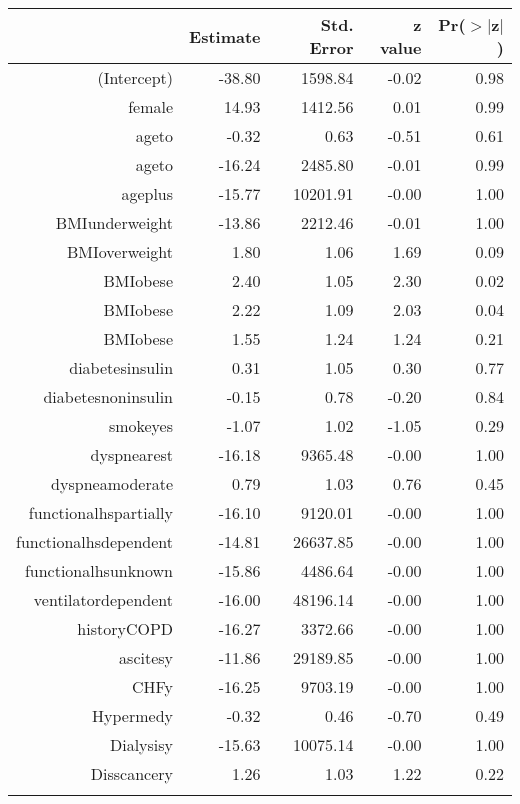 \bigskip\bigskip
\centering
\begin{tabular}{rrrrr}
  \hline
 & Estimate & Std. Error & z value & Pr($>$$|$z$|$) \\ 
  \hline
(Intercept) & -38.80 & 1598.84 & -0.02 & 0.98 \\ 
  female & 14.93 & 1412.56 & 0.01 & 0.99 \\ 
  age\-65\-to\-74 & -0.32 & 0.63 & -0.51 & 0.61 \\ 
  age\-75\-to\-84 & -16.24 & 2485.80 & -0.01 & 0.99 \\ 
  age\-85\-plus & -15.77 & 10201.91 & -0.00 & 1.00 \\ 
  BMI\-underweight & -13.86 & 2212.46 & -0.01 & 1.00 \\ 
  BMI\-overweight & 1.80 & 1.06 & 1.69 & 0.09 \\ 
  BMI\-obese\-1 & 2.40 & 1.05 & 2.30 & 0.02 \\ 
  BMI\-obese\-2 & 2.22 & 1.09 & 2.03 & 0.04 \\ 
  BMI\-obese\-3 & 1.55 & 1.24 & 1.24 & 0.21 \\ 
  diabetes\-insulin & 0.31 & 1.05 & 0.30 & 0.77 \\ 
  diabetes\-noninsulin & -0.15 & 0.78 & -0.20 & 0.84 \\ 
  smoke\-yes & -1.07 & 1.02 & -1.05 & 0.29 \\ 
  dyspnea\-rest & -16.18 & 9365.48 & -0.00 & 1.00 \\ 
  dyspnea\-moderate & 0.79 & 1.03 & 0.76 & 0.45 \\ 
  functional\-hs\-partially & -16.10 & 9120.01 & -0.00 & 1.00 \\ 
  functional\-hs\-dependent & -14.81 & 26637.85 & -0.00 & 1.00 \\ 
  functional\-hs\-unknown & -15.86 & 4486.64 & -0.00 & 1.00 \\ 
  ventilator\-dependent & -16.00 & 48196.14 & -0.00 & 1.00 \\ 
  history\-COPD & -16.27 & 3372.66 & -0.00 & 1.00 \\ 
  ascites\-y & -11.86 & 29189.85 & -0.00 & 1.00 \\ 
  CHF\-y & -16.25 & 9703.19 & -0.00 & 1.00 \\ 
  Hyper\-med\-y & -0.32 & 0.46 & -0.70 & 0.49 \\ 
  Dialysis\-y & -15.63 & 10075.14 & -0.00 & 1.00 \\ 
  Diss\-cancer\-y & 1.26 & 1.03 & 1.22 & 0.22 \\ 
$$
\end{tabular}
